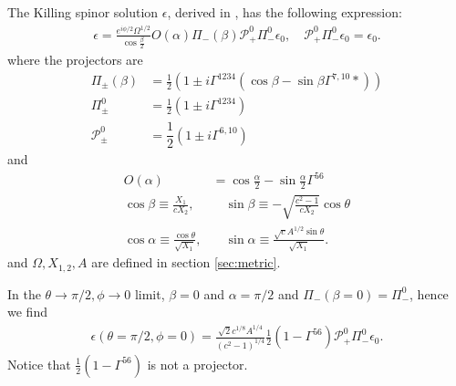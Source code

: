 
The Killing spinor solution $\epsilon$, derived in \cite{Pilch:2003jg}, has the following expression:
\begin{align}
\epsilon = \frac{e^{i\phi/2}\Omega^{1/2}}{\cos\frac{\beta}{2}}O(\alpha)
\Pi_-(\beta) \mathcal{P}_+^{0} \Pi^0_-\epsilon_0, \quad 
\mathcal{P}_+^{0} \Pi^0_-\epsilon_0 = \epsilon_0.
\end{align}
where the projectors are
\begin{align}
\Pi_\pm (\beta) &= 
\frac{1}{2}\left( 1 \pm i\Gamma^{1234} \left(\cos\beta - \sin \beta \Gamma^{7,10} * \right)\right)\\
\Pi_\pm^0 &= 
\frac{1}{2}\left(1 \pm i\Gamma^{1234}\right)\\
\mathcal{P}_{\pm}^{0} &=
\dfrac{1}{2} \left(1\pm i\Gamma^{6,10}\right)
\end{align}
and 
\begin{align}
O(\alpha)  &= 
\cos\frac{\alpha}{2} - \sin\frac{\alpha}{2}\Gamma^{5 6}\\
\cos\beta \equiv \frac{X_1}{c X_2}, 
&\quad
\sin\beta \equiv -\sqrt{\frac{c^2 - 1}{c X_2}}\cos\theta\\
\cos\alpha \equiv \frac{\cos\theta}{\sqrt{X_1}}, &\quad
\sin\alpha \equiv \frac{\sqrt{c}A^{1/2}\sin\theta}{\sqrt{X_1}}.
\end{align}
and $\Omega, X_{1,2}, A$ are defined in section \ref{sec:metric}.


In the  $\theta\to\pi/2, \phi \to 0$ limit, 
$\beta = 0$ and $\alpha = \pi/2$ and $\Pi_-(\beta=0) = \Pi_-^0$, hence we find
\begin{align}\label{eq: KillingSpinorClassic}
\epsilon(\theta=\pi/2,\phi=0) = \frac{\sqrt{2}c^{1/8}A^{1/4}}{(c^2-1)^{1/4}}
\frac{1}{2}(1-\Gamma^{56})\mathcal{P}_+^{0} \Pi^0_-\epsilon_0.
\end{align}
Notice that $\frac{1}{2}(1-\Gamma^{56})$ is not a projector. 
